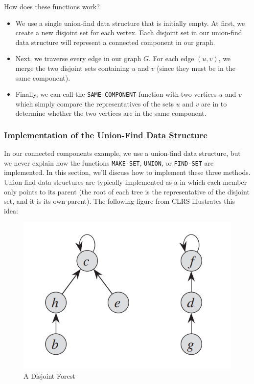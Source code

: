 How does these functions work?

\begin{itemize}
    \item We use a single union-find data structure that is initially empty. At first, we create a new disjoint set for each vertex. Each disjoint set in our union-find data structure will represent a connected component in our graph.
    \item Next, we traverse every edge in our graph $G$. For each edge $(u, v)$, we merge the two disjoint sets containing $u$ and $v$ (since they must be in the same component). 
    \item Finally, we can call the \verb!SAME-COMPONENT! function with two vertices $u$ and $v$ which simply compare the representatives of the sets $u$ and $v$ are in to determine whether the two vertices are in the same component.
\end{itemize}

\subsubsection{Implementation of the Union-Find Data Structure}

In our connected components example, we use a union-find data structure, but we never explain how the functions \verb!MAKE-SET!, \verb!UNION!, or \verb!FIND-SET! are implemented. In this section, we'll discuss how to implement these three methods. \\

Union-find data structures are typically implemented as a  in which each member only points to its parent (the root of each tree is the representative of the disjoint set, and it is its own parent). The following figure from CLRS illustrates this idea:


\begin{figure}[h]
\centering
\includegraphics[scale=0.4]{media/ufds1}
\caption{A Disjoint Forest}
\end{figure}

